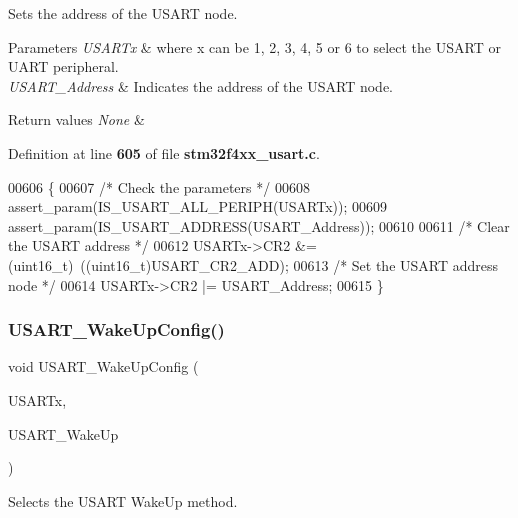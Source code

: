 Sets the address of the U\+S\+A\+RT node. 


\begin{DoxyParams}{Parameters}
{\em U\+S\+A\+R\+Tx} & where x can be 1, 2, 3, 4, 5 or 6 to select the U\+S\+A\+RT or U\+A\+RT peripheral. \\
\hline
{\em U\+S\+A\+R\+T\+\_\+\+Address} & Indicates the address of the U\+S\+A\+RT node. \\
\hline
\end{DoxyParams}

\begin{DoxyRetVals}{Return values}
{\em None} & \\
\hline
\end{DoxyRetVals}


Definition at line \textbf{ 605} of file \textbf{ stm32f4xx\+\_\+usart.\+c}.


\begin{DoxyCode}
00606 \{
00607   \textcolor{comment}{/* Check the parameters */}
00608   assert_param(IS_USART_ALL_PERIPH(USARTx));
00609   assert_param(IS_USART_ADDRESS(USART\_Address)); 
00610     
00611   \textcolor{comment}{/* Clear the USART address */}
00612   USARTx->CR2 &= (uint16\_t)~((uint16\_t)USART_CR2_ADD);
00613   \textcolor{comment}{/* Set the USART address node */}
00614   USARTx->CR2 |= USART\_Address;
00615 \}
\end{DoxyCode}
\mbox{\label{group__USART__Group3_ga4965417c2412c36e462fcad50a8d5393}} 
\subsubsection{U\+S\+A\+R\+T\+\_\+\+Wake\+Up\+Config()}
{\footnotesize\ttfamily void U\+S\+A\+R\+T\+\_\+\+Wake\+Up\+Config (\begin{DoxyParamCaption}\item[{\textbf{ U\+S\+A\+R\+T\+\_\+\+Type\+Def} $\ast$}]{U\+S\+A\+R\+Tx,  }\item[{uint16\+\_\+t}]{U\+S\+A\+R\+T\+\_\+\+Wake\+Up }\end{DoxyParamCaption})}



Selects the U\+S\+A\+RT Wake\+Up method. 


